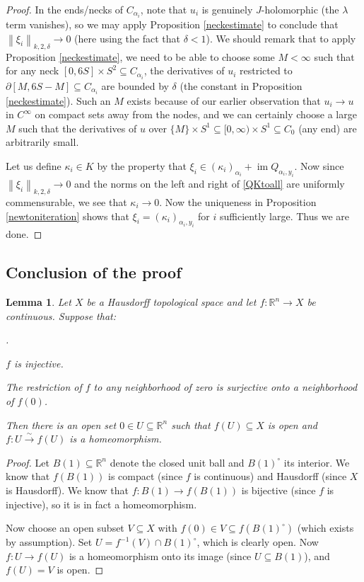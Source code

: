 \documentclass[12pt]{article}
\newtheorem{lemma}[theorem]{Lemma}
\theoremstyle{definition}
\theoremstyle{remark}
\numberwithin{equation}{subsection}
\newcommand{\RR}{\mathbb R}
\newcommand{\im}{\operatorname{im}}
\newcounter{rcounti}
\newenvironment{rlist}{\begin{list}{\roman{rcounti}.}{\usecounter{rcounti}
\setlength\itemsep{0pt}
\setlength\labelsep{4pt}
\setlength\labelwidth{16pt}
\setlength\leftmargin{32pt}
\setlength\listparindent{0pt}
\setlength\parsep{0pt}
\setlength\parskip{0pt}
\setlength\partopsep{0pt}
\setlength\rightmargin{0pt}
\setlength\topsep{0pt}
\setlength\itemindent{0pt}
}}{\end{list}}
\begin{document}
\begin{proof}
In the ends/necks of $C_{\alpha_i}$, note that $u_i$ is genuinely $J$-holomorphic (the $\lambda$ term vanishes), so we may apply Proposition \ref{neckestimate} to conclude that $\left\|\xi_i\right\|_{k,2,\delta}\to 0$ (here using the fact that $\delta<1$).  We should remark that to apply Proposition \ref{neckestimate}, we need to be able to choose some $M<\infty$ such that for any neck $[0,6S]\times S^2\subseteq C_{\alpha_i}$, the derivatives of $u_i$ restricted to $\partial[M,6S-M]\subseteq C_{\alpha_i}$ are bounded by $\delta$ (the constant in Proposition \ref{neckestimate}).  Such an $M$ exists because of our earlier observation that $u_i\to u$ in $C^\infty$ on compact sets away from the nodes, and we can certainly choose a large $M$ such that the derivatives of $u$ over $\{M\}\times S^1\subseteq[0,\infty)\times S^1\subseteq C_0$ (any end) are arbitrarily small.

Let us define $\kappa_i\in K$ by the property that $\xi_i\in(\kappa_i)_{\alpha_i}+\im Q_{\alpha_i,y_i}$.  Now since $\left\|\xi_i\right\|_{k,2,\delta}\to 0$ and the norms on the left and right of \eqref{QKtoall} are uniformly commensurable, we see that $\kappa_i\to 0$.  Now the uniqueness in Proposition \ref{newtoniteration} shows that $\xi_i=(\kappa_i)_{\alpha_i,y_i}$ for $i$ sufficiently large.  Thus we are done.
\end{proof}

\subsection{Conclusion of the proof}

\begin{lemma}\label{injectiveHdorffhomeo}
Let $X$ be a Hausdorff topological space and let $f:\RR^n\to X$ be continuous.  Suppose that:
\begin{rlist}
\item$f$ is injective.
\item The restriction of $f$ to any neighborhood of zero is surjective onto a neighborhood of $f(0)$.
\end{rlist}
Then there is an open set $0\in U\subseteq\RR^n$ such that $f(U)\subseteq X$ is open and $f:U\xrightarrow\sim f(U)$ is a homeomorphism.
\end{lemma}

\begin{proof}
Let $B(1)\subseteq\RR^n$ denote the closed unit ball and $B(1)^\circ$ its interior.  We know that $f(B(1))$ is compact (since $f$ is continuous) and Hausdorff (since $X$ is Hausdorff).  We know that $f:B(1)\to f(B(1))$ is bijective (since $f$ is injective), so it is in fact a homeomorphism.

Now choose an open subset $V\subseteq X$ with $f(0)\in V\subseteq f(B(1)^\circ)$ (which exists by assumption).  Set $U=f^{-1}(V)\cap B(1)^\circ$, which is clearly open.  Now $f:U\to f(U)$ is a homeomorphism onto its image (since $U\subseteq B(1)$), and $f(U)=V$ is open.
\end{proof}
\end{document}

